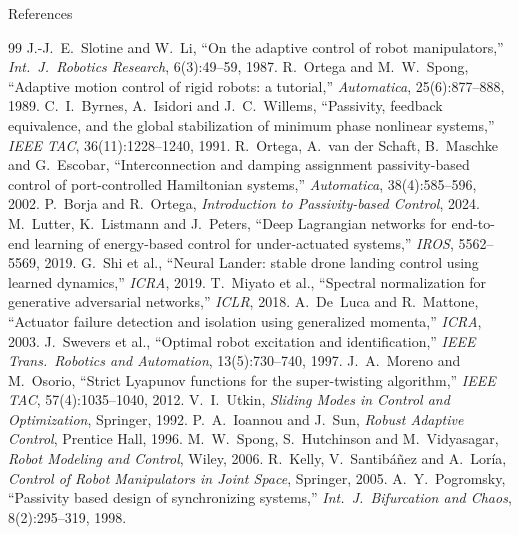 \documentclass[aspectratio=169,10pt]{beamer}
\begin{document}
\begin{frame}[allowframebreaks]{References}
\footnotesize
{}
\begin{thebibliography}{99}
 J.-J.~E.~Slotine and W.~Li, ``On the adaptive control of robot manipulators,'' \emph{Int.\ J.\ Robotics Research}, 6(3):49--59, 1987.
 R.~Ortega and M.~W.~Spong, ``Adaptive motion control of rigid robots: a tutorial,'' \emph{Automatica}, 25(6):877--888, 1989.
 C.~I.~Byrnes, A.~Isidori and J.~C.~Willems, ``Passivity, feedback equivalence, and the global stabilization of minimum phase nonlinear systems,'' \emph{IEEE TAC}, 36(11):1228--1240, 1991.
 R.~Ortega, A.~van der Schaft, B.~Maschke and G.~Escobar, ``Interconnection and damping assignment passivity-based control of port-controlled Hamiltonian systems,'' \emph{Automatica}, 38(4):585--596, 2002.
 P.~Borja and R.~Ortega, \emph{Introduction to Passivity-based Control}, 2024.
 M.~Lutter, K.~Listmann and J.~Peters, ``Deep Lagrangian networks for end-to-end learning of energy-based control for under-actuated systems,'' \emph{IROS}, 5562--5569, 2019.
 G.~Shi et al., ``Neural Lander: stable drone landing control using learned dynamics,'' \emph{ICRA}, 2019.
 T.~Miyato et al., ``Spectral normalization for generative adversarial networks,'' \emph{ICLR}, 2018.
 A.~De~Luca and R.~Mattone, ``Actuator failure detection and isolation using generalized momenta,'' \emph{ICRA}, 2003.
 J.~Swevers et al., ``Optimal robot excitation and identification,'' \emph{IEEE Trans.\ Robotics and Automation}, 13(5):730--740, 1997.
 J.~A.~Moreno and M.~Osorio, ``Strict Lyapunov functions for the super-twisting algorithm,'' \emph{IEEE TAC}, 57(4):1035--1040, 2012.
 V.~I.~Utkin, \emph{Sliding Modes in Control and Optimization}, Springer, 1992.
 P.~A.~Ioannou and J.~Sun, \emph{Robust Adaptive Control}, Prentice Hall, 1996.
 M.~W.~Spong, S.~Hutchinson and M.~Vidyasagar, \emph{Robot Modeling and Control}, Wiley, 2006.
 R.~Kelly, V.~Santib\'a\~nez and A.~Lor\'ia, \emph{Control of Robot Manipulators in Joint Space}, Springer, 2005.
 A.~Y.~Pogromsky, ``Passivity based design of synchronizing systems,'' \emph{Int.\ J.\ Bifurcation and Chaos}, 8(2):295--319, 1998.
\end{thebibliography}
\end{frame}
\end{document}

